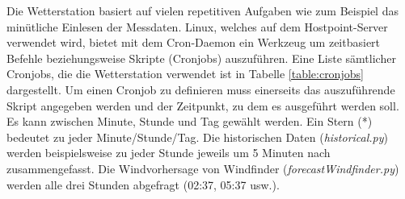 
Die Wetterstation basiert auf vielen repetitiven Aufgaben wie zum Beispiel das minütliche Einlesen der Messdaten. Linux, welches auf dem Hostpoint-Server verwendet wird, bietet mit dem Cron-Daemon ein Werkzeug um zeitbasiert Befehle beziehungsweise Skripte (Cronjobs) auszuführen. Eine Liste sämtlicher Cronjobs, die die Wetterstation verwendet ist in Tabelle \ref{table:cronjobs} dargestellt. Um einen Cronjob zu definieren muss einerseits das auszuführende Skript angegeben werden und der Zeitpunkt, zu dem es ausgeführt werden soll. Es kann zwischen Minute, Stunde und Tag gewählt werden. Ein Stern (*) bedeutet zu jeder Minute/Stunde/Tag. Die historischen Daten (\emph{historical.py}) werden beispielsweise zu jeder Stunde jeweils um 5 Minuten nach zusammengefasst. Die Windvorhersage von Windfinder (\emph{forecastWindfinder.py}) werden alle drei Stunden abgefragt (02:37, 05:37 usw.).




